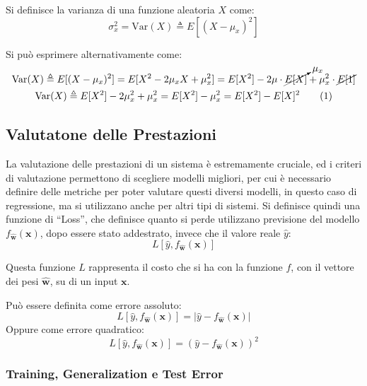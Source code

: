 \documentclass{article}
\numberwithin{equation}{subsection}
\newcommand{\tageq}{\tag{\stepcounter{equation}\theequation}}
\newcommand{\vect}[1]{\boldsymbol{\mathbf{#1}}}
\begin{document}
Si definisce la varianza di una funzione aleatoria $X$ come:
\begin{equation}
    \sigma^2_x=\text{Var}(X)\triangleq E[(X-\mu_x)^2]
\end{equation}

Si può esprimere alternativamente come:
\begin{gather*}
    \text{Var}(X)\triangleq E[(X-\mu_x)^2]=E[X^2-2\mu_xX+\mu_x^2]=E[X^2]-2\mu\cdot\cancelto{\mu_x}{E[X]}+\mu_x^2\cdot\cancel{E[1]}\\
    \text{Var}(X)\triangleq E[X^2]-2\mu_x^2+\mu_x^2=E[X^2]-\mu_x^2=E[X^2]-E[X]^2\tageq
\end{gather*}

\subsection{Valutatone delle Prestazioni}

La valutazione delle prestazioni di un sistema è estremamente cruciale, ed i criteri di 
valutazione permettono di scegliere modelli migliori, per cui è necessario definire 
delle metriche per poter valutare questi diversi modelli, in questo caso di regressione, ma si utilizzano anche per altri tipi di sistemi. Si definisce quindi una 
funzione di ``Loss'', che definisce quanto si perde utilizzano previsione del modello $f_{\vect{\hat{w}}}(\vect{x})$, dopo essere stato addestrato, invece che il valore reale $\hat{y}$:
\begin{equation}
    L[\hat{y}, f_{\vect{\hat{w}}}(\vect{x})]
\end{equation}

Questa funzione $L$ rappresenta il costo che si ha con la funzione $f$, con il vettore dei 
pesi $\vect{\hat{w}}$, su di un input $\vect{x}$. 

Può essere definita come errore assoluto:
\begin{equation*}
    L[\hat{y}, f_{\vect{\hat{w}}}(\vect{x})]=|\hat{y}- f_{\vect{\hat{w}}}(\vect{x})|
\end{equation*}
Oppure come errore quadratico:
\begin{equation*}
    L[\hat{y}, f_{\vect{\hat{w}}}(\vect{x})]=(\hat{y}- f_{\vect{\hat{w}}}(\vect{x}))^2
\end{equation*}

\subsubsection{Training, Generalization e Test Error}
\end{document}
